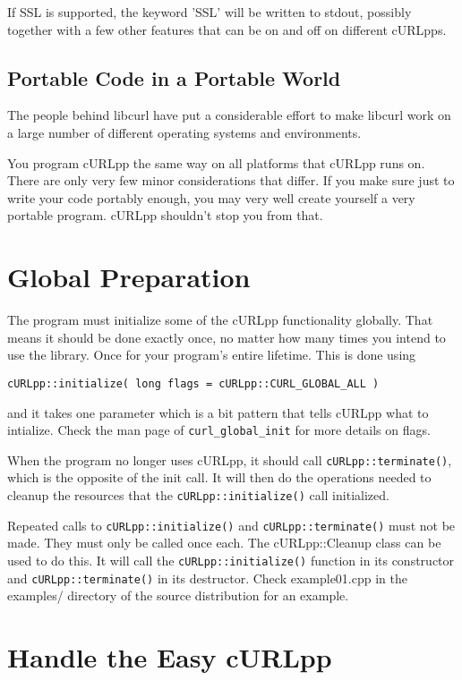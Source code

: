 \documentclass{article}
\begin{document}
If SSL is supported, the keyword 'SSL' will be written to stdout,
possibly together with a few other features that can be on and off on
different cURLpps.


\subsection{Portable Code in a Portable World}

The people behind libcurl have put a considerable effort to make libcurl work
on a large number of different operating systems and environments.

You program cURLpp the same way on all platforms that cURLpp runs on. There
are only very few minor considerations that differ. If you make sure just to
write your code portably enough, you may very well create yourself a very
portable program. cURLpp shouldn't stop you from that.

\section{Global Preparation}

The program must initialize some of the cURLpp functionality globally. That
means it should be done exactly once, no matter how many times you intend to
use the library. Once for your program's entire lifetime. This is done using

\begin{verbatim} 
cURLpp::initialize( long flags = cURLpp::CURL_GLOBAL_ALL ) 
\end{verbatim}

and it takes one parameter which is a bit pattern that tells cURLpp what to
intialize. Check the man page of \verb+curl_global_init+ for more details on flags.

When the program no longer uses cURLpp, it should call \verb+cURLpp::terminate()+, 
which is the opposite of the init call. It will then do the operations needed 
to cleanup the resources that the \verb+cURLpp::initialize()+ call initialized. 

Repeated calls to \verb+cURLpp::initialize()+ and \verb+cURLpp::terminate()+ must not be made. 
They must only be called once each. The cURLpp::Cleanup class can be used to do this. It will
call the \verb+cURLpp::initialize()+ function in its constructor and \verb+cURLpp::terminate()+
in its destructor.  Check example01.cpp in the examples/ directory of
the source distribution for an example. 

\section{Handle the Easy cURLpp}
\end{document}
